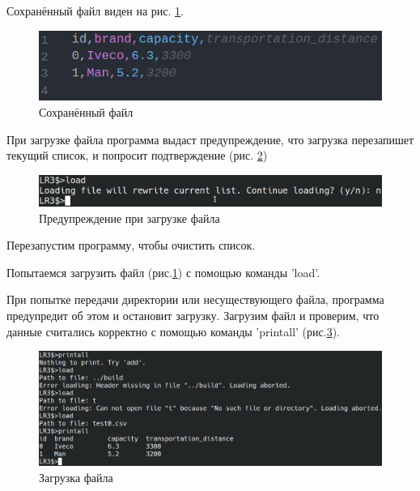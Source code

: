 Сохранённый файл виден на рис. \ref{test.file}.

\begin{figure}[hpt!]
    \centering
    \includegraphics[width=0.9\linewidth]{photo/test.file}
    \caption{Сохранённый файл}
    \label{test.file}
\end{figure}

При загрузке файла программа выдаст предупреждение, что 
загрузка перезапишет текущий список, и попросит подтверждение (рис. \ref{test.load.exist})

\begin{figure}[hpt!]
    \centering
    \includegraphics[width=0.9\linewidth]{photo/test.load.exist}
    \caption{Предупреждение при загрузке файла}
    \label{test.load.exist}
\end{figure}

Перезапустим программу, чтобы очистить список.

Попытаемся загрузить файл (рис.\ref{test.file}) с помощью команды 'load'.

При попытке передачи директории или несуществующего файла, 
программа предупредит об этом и остановит загрузку.
Загрузим файл и проверим, что данные считались корректно 
с помощью команды 'printall' (рис.\ref{test.load}).

\begin{figure}[hpt!]
    \centering
    \includegraphics[width=0.9\linewidth]{photo/test.load}
    \caption{Загрузка файла}
    \label{test.load}
\end{figure}